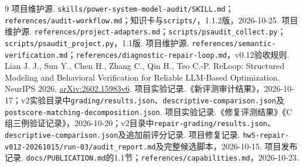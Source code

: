 \documentclass[chinese]{iarticle}
\begin{document}
\begin{thebibliography}{9}
\small
\setlength{\itemsep}{1pt}
 项目维护源. \texttt{skills/power-system-model-audit/SKILL.md}；\texttt{references/audit-workflow.md}；知识卡与\texttt{scripts/}，1.1.2版，2026-10-25.
 项目维护源. \texttt{references/project-adapters.md}；\texttt{scripts/psaudit\_collect.py}；\texttt{scripts/psaudit\_project.py}，1.1版.
 项目维护源. \texttt{references/semantic-verification.md}；\texttt{references/diagnostic-repair-loop.md}，v0.12验收规则.
 Lian J. J., Sun Y., Chen H., Zhang C., Qin H., Teo C.-P. ReLoop: Structured Modeling and Behavioral Verification for Reliable LLM-Based Optimization. NeurIPS 2026. \href{https://arxiv.org/abs/2602.15983v6}{arXiv:2602.15983v6}.
 项目实验记录.《新评测审计结果》，2026-10-17；v2实验目录中\texttt{grading/results.json}、\texttt{descriptive-comparison.json}及\texttt{postscore-matching-decomposition.json}.
 项目实验记录.《修复评测结果》《C组三例验证记录》，2026-10-20；v2目录中\texttt{repair-grading/results.json}、\texttt{descriptive-comparison.json}及追加前评分记录.
 项目修复记录. \texttt{hw5-repair-v012-20261015/run-03/audit\_report.md}及完整候选脚本，2026-10-15.
 项目发布记录. \texttt{docs/PUBLICATION.md}的1.1节；\texttt{references/capabilities.md}，2026-10-23.
\end{thebibliography}
\end{document}
